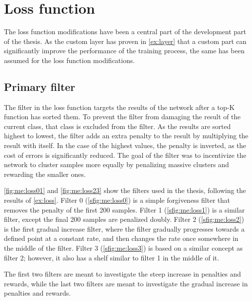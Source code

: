 
\section{Loss function}
The loss function modifications have been a central part of the development part of the thesis.
As the custom layer has proven in \cref{ex:layer} that a custom part can significantly improve the performance of the training process, the same has been assumed for the loss function modifications.

\subsection{Primary filter}
The filter in the loss function targets the results of the network after a top-K function has sorted them.
To prevent the filter from damaging the result of the current class, that class is excluded from the filter.
As the results are sorted highest to lowest, the filter adds an extra penalty to the result by multiplying the result with itself.
In the case of the highest values, the penalty is inverted, as the cost of errors is significantly reduced.
The goal of the filter was to incentivize the network to cluster samples more equally by penalizing massive clusters and rewarding the smaller ones.

\cref{fig:me:loss01} and \cref{fig:me:loss23} show the filters used in the thesis, following the results of \cref{ex:loss}.
Filter 0 (\cref{sfig:me:loss0}) is a simple forgiveness filter that removes the penalty of the first 200 samples.
Filter 1 (\cref{sfig:me:loss1}) is a similar filter, except the final 200 samples are penalized doubly.
Filter 2 (\cref{sfig:me:loss2}) is the first gradual increase filter, where the filter gradually progresses towards a defined point at a constant rate, and then changes the rate once somewhere in the middle of the filter.
Filter 3 (\cref{sfig:me:loss3}) is based on a similar concept as filter 2; however, it also has a shelf similar to filter 1 in the middle of it.

The first two filters are meant to investigate the steep increase in penalties and rewards, while the last two filters are meant to investigate the gradual increase in penalties and rewards.

